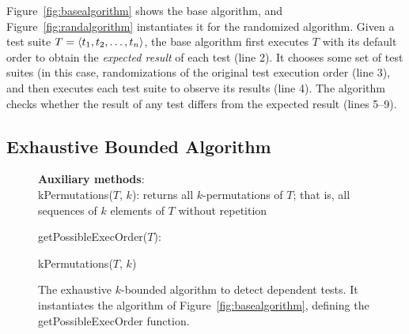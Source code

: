 Figure~\ref{fig:basealgorithm} shows the base algorithm, and
Figure~\ref{fig:randalgorithm} instantiates it for the randomized algorithm.
Given a test suite $T =  \langle t_1, t_2, \ldots, t_n \rangle $, the base algorithm
first executes $T$ with its default order
to obtain the \emph{expected result} of each test (line 2).
It chooses some set of test suites (in this case, randomizations of the original
test execution order (line 3), and then executes each test suite
to observe its results (line 4). The algorithm checks
whether the result of any test differs from the
expected result (lines 5--9). 





\subsection{Exhaustive Bounded Algorithm}
\label{sec:basic}

\begin{figure}[t]
\textbf{Auxiliary methods}:\\
kPermutations($T$, $k$): returns all $k$-permutations of $T$; that is, all
sequences of $k$ elements of $T$ without repetition

\medskip

getPossibleExecOrder($T$):\\
\vspace{-5mm}
\begin{algorithmic}[1]
\RETURN kPermutations($T$, $k$)
\end{algorithmic}

\vspace{-3mm}
\caption {The exhaustive $k$-bounded algorithm to detect dependent tests.
It instantiates the algorithm of Figure~\ref{fig:basealgorithm}, defining the
getPossibleExecOrder function.
} 
\label{fig:exhaustivealgorithm}
\end{figure}


